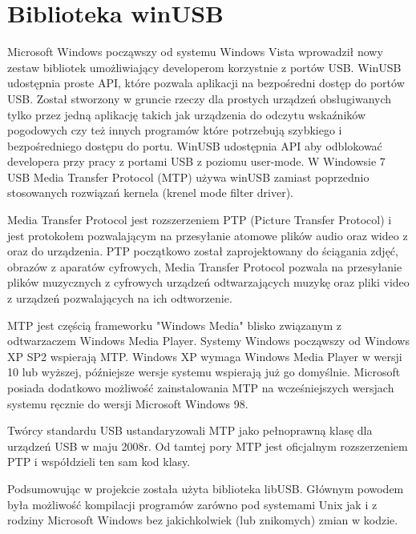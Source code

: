 \documentclass{BscUS}
\begin{document}
\section{Biblioteka winUSB}
Microsoft Windows począwszy od systemu Windows Vista wprowadził nowy zestaw bibliotek umożliwiający developerom korzystnie z portów USB. WinUSB udostępnia proste API, które pozwala aplikacji na bezpośredni dostęp do portów USB. Został stworzony w gruncie rzeczy dla prostych urządzeń obsługiwanych tylko przez jedną aplikację takich jak urządzenia do odczytu wskaźników pogodowych czy też innych programów które potrzebują szybkiego i bezpośredniego dostępu do portu. WinUSB udostępnia API aby odblokować developera przy pracy z portami USB z poziomu user-mode. W Windowsie 7 USB Media Transfer Protocol (MTP) używa winUSB zamiast poprzednio stosowanych rozwiązań kernela (krenel mode filter driver).

Media Transfer Protocol jest rozszerzeniem PTP (Picture Transfer Protocol) i jest protokołem pozwalającym na przesyłanie atomowe plików audio oraz wideo z oraz do urządzenia. PTP początkowo został zaprojektowany do ściągania zdjęć, obrazów z aparatów cyfrowych, Media Transfer Protocol pozwala na przesyłanie plików muzycznych z cyfrowych urządzeń odtwarzających muzykę oraz pliki video z urządzeń pozwalających na ich odtworzenie.

MTP jest częścią frameworku "Windows Media" blisko związanym z odtwarzaczem Windows Media Player. Systemy Windows począwszy od Windows XP SP2 wspierają MTP. Windows XP wymaga Windows Media Player w wersji 10 lub wyższej, późniejsze wersje systemu wspierają już go domyślnie. Microsoft posiada dodatkowo możliwość zainstalowania MTP na wcześniejszych wersjach systemu ręcznie do wersji Microsoft Windows 98.

Twórcy standardu USB ustandaryzowali MTP jako pełnoprawną klasę dla urządzeń USB w maju 2008r.
Od tamtej pory MTP jest oficjalnym rozszerzeniem PTP i współdzieli ten sam kod klasy. \cite{winusbDesc, micrDevAppUSBDev, micrAccUsbDev, micCommWithUsb}
\newline

\indent Podsumowując w projekcie została użyta biblioteka libUSB. Głównym powodem była możliwość kompilacji programów zarówno pod systemami Unix jak i z rodziny Microsoft Windows bez jakichkolwiek (lub znikomych) zmian w kodzie.
\end{document}
